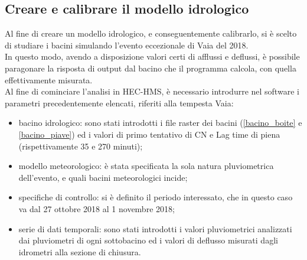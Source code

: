 \subsection{Creare e calibrare il modello idrologico}
Al fine di creare un modello idrologico, e conseguentemente calibrarlo, si è scelto di studiare i bacini simulando l'evento eccezionale di Vaia del 2018.\\
In questo modo, avendo a disposizione valori certi di afflussi e deflussi, è possibile paragonare la risposta di output dal bacino che il programma calcola, con quella effettivamente misurata.\\
Al fine di cominciare l'analisi in HEC-HMS, è necessario introdurre nel software i parametri precedentemente elencati, riferiti alla tempesta Vaia:
\begin{itemize}
    \item bacino idrologico: sono stati introdotti i file raster dei bacini (\ref{bacino_boite} e \ref{bacino_piave}) ed i valori di primo tentativo di CN e Lag time di piena (rispettivamente 35 e 270 minuti);
    \item modello meteorologico: è stata specificata la sola natura pluviometrica dell'evento, e quali bacini meteorologici incide;
    \item specifiche di controllo: si è definito il periodo interessato, che in questo caso va dal 27 ottobre 2018 al 1 novembre 2018;
    \item serie di dati temporali: sono stati introdotti i valori pluviometrici analizzati dai pluviometri di ogni sottobacino ed i valori di deflusso misurati dagli idrometri alla sezione di chiusura.
\end{itemize}

